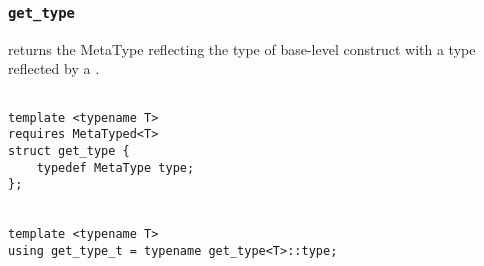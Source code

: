 
\subsubsection{\texttt{get\_type}}

returns the MetaType reflecting the type of base-level construct with a type reflected by a .

\begin{verbatim}

template <typename T>
requires MetaTyped<T>
struct get_type {
	typedef MetaType type;
};


template <typename T>
using get_type_t = typename get_type<T>::type;

\end{verbatim}
